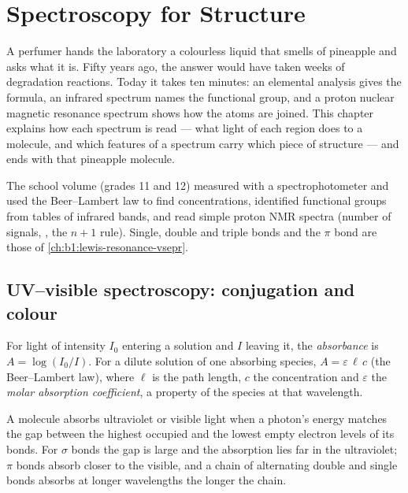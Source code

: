 \chapter{Spectroscopy for Structure}\label{ch:b1:structure-spectroscopy}

A perfumer hands the laboratory a colourless liquid that smells of
pineapple and asks what it is. Fifty years ago, the answer would have
taken weeks of degradation reactions. Today it takes ten minutes: an
elemental analysis gives the formula, an infrared spectrum names the
functional group, and a proton nuclear magnetic resonance spectrum shows
how the atoms are joined. This chapter explains how each spectrum is
read --- what light of each region does to a molecule, and which
features of a spectrum carry which piece of structure --- and ends with
that pineapple molecule.

\begin{recall}
The school volume (grades 11 and 12) measured  with a
spectrophotometer and used the Beer--Lambert law to find concentrations,
identified functional groups from tables of infrared bands, and read
simple proton NMR spectra (number of signals, , the $n + 1$
rule). Single, double and triple bonds and the $\pi$ bond are those of
\cref{ch:b1:lewis-resonance-vsepr}.
\end{recall}

\section{UV--visible spectroscopy: conjugation and colour}

\begin{definition}\label{def:b1:structure-spectroscopy:absorbance}
For light of intensity $I_0$ entering a solution and $I$ leaving it, the
\emph{absorbance} is $A = \log(I_0/I)$. For a dilute
solution of one absorbing species, $A = \varepsilon\,\ell\,c$ (the
Beer--Lambert law), where $\ell$ is the path length, $c$ the
concentration and $\varepsilon$ the \emph{molar absorption
coefficient}, a property of the
species at that wavelength.
\end{definition}

A molecule absorbs ultraviolet or visible light when a photon's energy
matches the gap between the highest occupied and the lowest empty
electron levels of its bonds. For $\sigma$ bonds the gap is large and the
absorption lies far in the ultraviolet; $\pi$ bonds absorb closer to the
visible, and a chain of alternating double and single bonds absorbs at
longer wavelengths the longer the chain.

